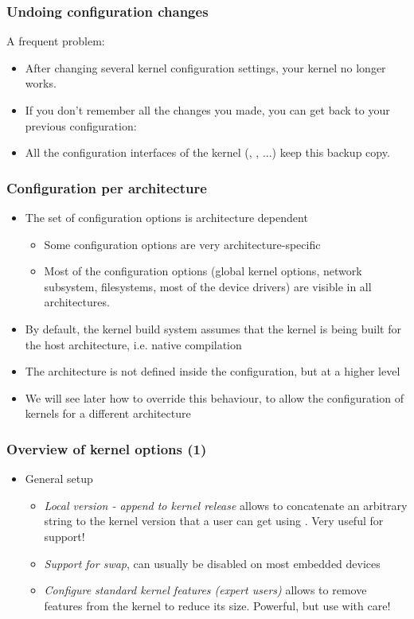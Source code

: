 \begin{frame}
  \frametitle{Undoing configuration changes}
  A frequent problem:
  \begin{itemize}
  \item After changing several kernel configuration settings, your
    kernel no longer works.
  \item If you don't remember all the changes you made,
    you can get back to your previous configuration:\\
  \item All the configuration interfaces of the kernel
    (, , ...) keep
    this  backup copy.
  \end{itemize}
\end{frame}

\begin{frame}
  \frametitle{Configuration per architecture}
  \begin{itemize}
  \item The set of configuration options is architecture dependent
    \begin{itemize}
    \item Some configuration options are very architecture-specific
    \item Most of the configuration options (global kernel options,
      network subsystem, filesystems, most of the device drivers) are
      visible in all architectures.
    \end{itemize}
  \item By default, the kernel build system assumes that the kernel is
    being built for the host architecture, i.e. native compilation
  \item The architecture is not defined inside the configuration, but
    at a higher level
  \item We will see later how to override this behaviour, to allow the
    configuration of kernels for a different architecture
  \end{itemize}
\end{frame}

\begin{frame}
  \frametitle{Overview of kernel options (1)}
  \begin{itemize}
  \item General setup
    \begin{itemize}
    \item {\em Local version - append to kernel release} allows to
      concatenate an arbitrary string to the kernel version that a
      user can get using . Very useful for support!
    \item {\em Support for swap}, can usually be disabled on most
      embedded devices
    \item {\em Configure standard kernel features (expert users)}
      allows to remove features from the kernel to reduce its
      size. Powerful, but use with care!
    \end{itemize}
  \end{itemize}
\end{frame}

